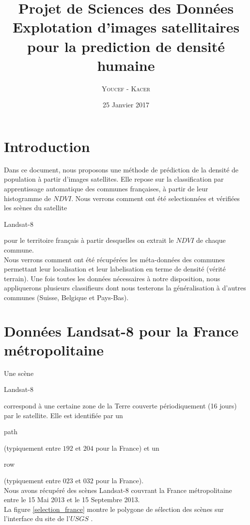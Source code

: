 \documentclass{book}
\title{%
  Projet de Sciences des Données \\
  \large Explotation d'images satellitaires \\pour la prediction de densité humaine\\
    }
\author{\textsc{Youcef} - \textsc{Kacer}}
\date{25 Janvier 2017}
\begin{document}
 
\maketitle

\tableofcontents

\frontmatter
\chapter{Introduction}
Dans ce document, nous proposons une méthode de prédiction de la densité de population à partir d'images satellites.
Elle repose sur la classification par apprentissage automatique des communes françaises, à partir de leur histogramme de $NDVI$. 
Nous verrons comment ont été selectionnées et vérifiées les scènes du satellite \begin{itshape}Landsat-8\end{itshape} pour le territoire français à partir desquelles on extrait le $NDVI$ de chaque commune.\\
Nous verrons comment ont été récupérées les méta-données des communes permettant leur localisation et leur labelisation en terme de densité (vérité terrain).
Une fois toutes les données nécessaires à notre disposition, nous appliquerons plusieurs classifieurs dont nous testerons la généralisation à d'autres communes (Suisse, Belgique et Pays-Bas).

\mainmatter
 
\chapter{Données Landsat-8 pour la France métropolitaine}

Une scène \begin{itshape}Landsat-8\end{itshape} correspond à une certaine zone de la Terre couverte périodiquement (16 jours) par le satellite. 
Elle est identifiée par un \begin{itshape}path\end{itshape} (typiquement entre
$192$ et $204$ pour la France) et un \begin{itshape}row\end{itshape} (typiquement entre $023$ et $032$ pour la France).\\ 
Nous avons récupéré des scènes Landsat-8 couvrant la France métropolitaine entre le 15 Mai 2013 et le 15 Septembre 2013.\\
La figure \ref{selection_france} montre le polygone de sélection des scènes sur l'interface du site de l'$USGS$ \cite{landsat8}.
\end{document}
